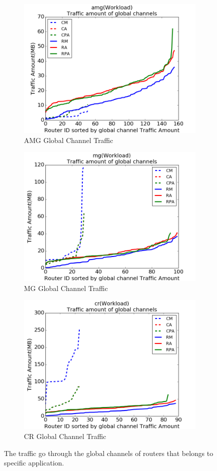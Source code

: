 \documentclass[conference,compsoc]{IEEEtran}
\begin{document}
\begin{figure}[t!]
    \centering
    \begin{subfigure}[t]{0.32\textwidth}
        \centering
        \includegraphics[height=1.8 in]{amg/gc-traffic}
        \caption{AMG Global Channel Traffic}
        \label{fig:amg-gc-traffic}
    \end{subfigure}%
    \hspace{1em}%
    \begin{subfigure}[t]{0.32\textwidth}
        \centering
        \includegraphics[height=1.8 in]{mg/gc-traffic}
        \caption{MG Global Channel Traffic}
        \label{fig:mg-gc-traffic}
    \end{subfigure}%
    \begin{subfigure}[t]{0.32\textwidth}
        \centering
        \includegraphics[height=1.8 in]{cr/gc-traffic}
        \caption{CR Global Channel Traffic}
        \label{fig:cr-gc-traffic}
    \end{subfigure}%
   \caption{The traffic go through the global channels of routers that belongs to specific application.}
   \label{fig:3app-gl-traffic}
\end{figure}
\end{document}
